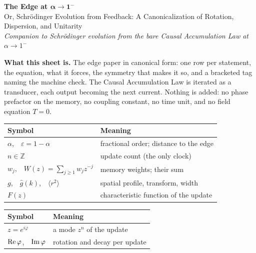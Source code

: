 \documentclass[10pt]{article}
\newcommand{\eps}{\varepsilon}
\newcommand{\gh}{\hat g}
\begin{document}
\color{black}
\vspace{0pt}
\begin{center}
{\Large\textbf{The Edge at $\boldsymbol{\alpha\to1^-}$}}\\[3pt]
{\large Or, Schr\"odinger Evolution from Feedback: A Canonicalization of Rotation, Dispersion, and Unitarity}\\[3pt]
\textit{Companion to Schr\"odinger evolution from the bare Causal Accumulation Law at $\alpha\to1^-$}
\end{center}
\vspace{1pt}
\begin{sheetbox}
\textbf{What this sheet is.} The edge paper in canonical form: one row per statement, the equation, what it forces, the symmetry that makes it so, and a bracketed tag naming the machine check. The Causal Accumulation Law is iterated as a transducer, each output becoming the next current. Nothing is added: no phase prefactor on the memory, no coupling constant, no time unit, and no field equation $T=0$.\par\vspace{3pt}
{\small\renewcommand{\arraystretch}{1.0}\setlength{\tabcolsep}{2.5pt}
\begin{minipage}[t]{0.505\linewidth}
\begin{tabular}[t]{@{}l l@{}}
\toprule
\textbf{Symbol} & \textbf{Meaning}\\
\midrule
$\alpha$,\ \ $\eps=1-\alpha$ & fractional order; distance to the edge\\
$n\in\mathbb Z$ & update count (the only clock)\\
$w_j$,\ \ $W(z)=\sum_{j\ge1}w_jz^{-j}$ & memory weights; their sum\\
$g$,\ \ $\gh(k)$,\ \ $\langle r^2\rangle$ & spatial profile, transform, width\\
$F(z)$ & characteristic function of the update\\
\bottomrule
\end{tabular}
\end{minipage}\hfill
\begin{minipage}[t]{0.47\linewidth}
\begin{tabular}[t]{@{}l l@{}}
\toprule
\textbf{Symbol} & \textbf{Meaning}\\
\midrule
$z=e^{i\varphi}$ & a mode $z^n$ of the update\\
${\rm Re}\,\varphi$,\ \ ${\rm Im}\,\varphi$ & rotation and decay per update\\

\end{tabular}
\end{minipage}}
\end{sheetbox}
\end{document}
